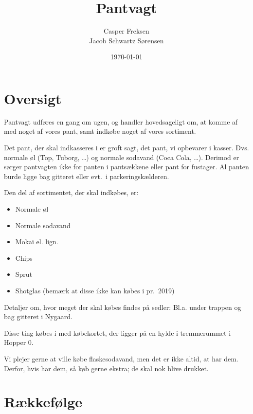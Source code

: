 

\title{Pantvagt}
\date{\today}
\author{Casper Freksen\\
Jacob Schwartz Sørensen}



\newcommand{\shoppingcartloc}{tremmerummet i Hopper-0}

\maketitle

\section{Oversigt}
\label{sec:oversigt}

Pantvagt udføres en gang om ugen, og handler hovedsageligt om, at
komme af med noget af vores pant, samt indkøbe noget af vores
sortiment.

Det pant, der skal indkasseres i \fotex er groft sagt, det pant, vi
opbevarer i kasser. Dvs. normale øl (Top, Tuborg, \dots) og normale
sodavand (Coca Cola, \dots).
Derimod er sørger pantvagten ikke for panten i pantsækkene
eller pant for fustager.
Al panten burde ligge bag gitteret eller evt.\ i parkeringskælderen.

Den del af sortimentet, der skal indkøbes, er:
\begin{itemize}
\item Normale øl
\item Normale sodavand
\item Mokaï\textsuperscript{\textregistered} el. lign.
\item Chips
\item Sprut
\item Shotglas (bemærk at disse ikke kan købes i \fotex pr.\ 2019)
\end{itemize}
Detaljer om, hvor meget der skal købes findes på sedler: Bl.a. under
trappen og bag gitteret i Nygaard.

Disse ting købes i \fotex med købekortet, der ligger på en hylde i
tremmerummet i Hopper 0.

Vi plejer gerne at ville købe flaskesodavand, men det er ikke altid,
at \fotex har dem. Derfor, hvis \fotex har dem, så køb gerne ekstra; de
skal nok blive drukket.

\section{Rækkefølge}
\label{sec:rakkefolge}

